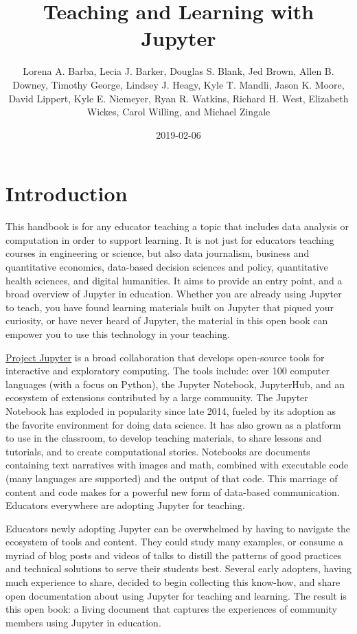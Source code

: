 \documentclass[]{book}
\title{Teaching and Learning with Jupyter}
\author{Lorena A. Barba, Lecia J. Barker, Douglas S. Blank, Jed Brown, Allen B.
Downey, Timothy George, Lindsey J. Heagy, Kyle T. Mandli, Jason K.
Moore, David Lippert, Kyle E. Niemeyer, Ryan R. Watkins, Richard H.
West, Elizabeth Wickes, Carol Willing, and Michael Zingale}
\date{2019-02-06}
\begin{document}
\maketitle

{
\setcounter{tocdepth}{1}
\tableofcontents
}
\chapter{Introduction}\label{intro}

This handbook is for any educator teaching a topic that includes data
analysis or computation in order to support learning. It is not just for
educators teaching courses in engineering or science, but also data
journalism, business and quantitative economics, data-based decision
sciences and policy, quantitative health sciences, and digital
humanities. It aims to provide an entry point, and a broad overview of
Jupyter in education. Whether you are already using Jupyter to teach,
you have found learning materials built on Jupyter that piqued your
curiosity, or have never heard of Jupyter, the material in this open
book can empower you to use this technology in your teaching.

\href{http://jupyter.org/}{Project Jupyter} is a broad collaboration
that develops open-source tools for interactive and exploratory
computing. The tools include: over 100 computer languages (with a focus
on Python), the Jupyter Notebook, JupyterHub, and an ecosystem of
extensions contributed by a large community. The Jupyter Notebook has
exploded in popularity since late 2014, fueled by its adoption as the
favorite environment for doing data science. It has also grown as a
platform to use in the classroom, to develop teaching materials, to
share lessons and tutorials, and to create computational stories.
Notebooks are documents containing text narratives with images and math,
combined with executable code (many languages are supported) and the
output of that code. This marriage of content and code makes for a
powerful new form of data-based communication. Educators everywhere are
adopting Jupyter for teaching.

Educators newly adopting Jupyter can be overwhelmed by having to
navigate the ecosystem of tools and content. They could study many
examples, or consume a myriad of blog posts and videos of talks to
distill the patterns of good practices and technical solutions to serve
their students best. Several early adopters, having much experience to
share, decided to begin collecting this know-how, and share open
documentation about using Jupyter for teaching and learning. The result
is this open book: a living document that captures the experiences of
community members using Jupyter in education.
\end{document}
